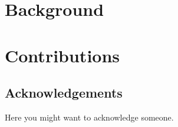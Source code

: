 \documentclass{Configuration_Files/PoliMi3i_thesis}
\begin{document}


\part{Background}\label{part:background}




\part{Contributions}\label{part:contributions}










\cleardoublepage
{} %
\appendix


\listoffigures

\listoftables


\chapter*{Acknowledgements}
Here you might want to acknowledge someone.


\cleardoublepage
\end{document}
